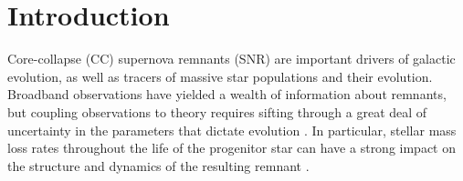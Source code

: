 \documentclass[twocolumn]{aastex631}
\begin{document}
\section{Introduction}
Core-collapse (CC) supernova remnants (SNR) are important drivers of galactic evolution, as well as tracers of massive star populations and their evolution. Broadband observations have yielded a wealth of information about remnants, but coupling observations to theory requires sifting through a great deal of uncertainty in the parameters that dictate evolution \citep[e.g.,][]{patnaude17b}. In particular, stellar mass loss rates throughout the life of the progenitor star can have a strong impact on the structure and dynamics of the resulting remnant \citep{pat15,pat17}. 

\end{document}

